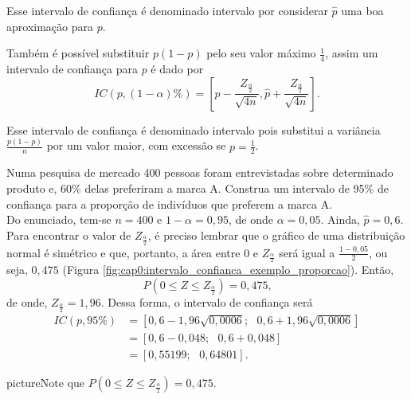 \documentclass[11pt,fleqn]{book}
\numberwithin{mpicture}{chapter}
\numberwithin{mtable}{chapter}
\numberwithin{mframe}{chapter}
\begin{document}
Esse intervalo de confiança é denominado intervalo  por considerar $\hat{p}$ uma boa aproximação para $p$.

Também é possível substituir $p(1-p)$ pelo seu valor máximo $\frac{1}{4}$, assim um intervalo de confiança para $p$ é dado por
\[
	IC(p,  (1-\alpha)\%) = \left [
		\hat{p} - \frac{Z_{\frac{\alpha}{2}}}{\sqrt{4n} }
		,
		\hat{p} + \frac{Z_{\frac{\alpha}{2}}}{\sqrt{4n} }
	\right ]
	\text{.}
\]

Esse intervalo de confiança é denominado intervalo  pois substitui a variância $\frac{p(1-p)}{n}$ por um valor maior, com excessão se $p=\frac{1}{2}$.

\begin{example}
	\label{example:exemplo_proporcao}
	Numa pesquisa de mercado 400 pessoas foram entrevistadas sobre determinado produto e, 60\% delas preferiram a marca A. Construa um intervalo de 95\% de confiança para a proporção de indivíduos que preferem a marca A.\\
	
	Do enunciado, tem-se $n=400$ e $1-\alpha=0,95$, de onde $\alpha=0,05$. Ainda, $\hat{p}=0,6$. Para encontrar o valor de $Z_{\frac{\alpha}{2}}$, é preciso lembrar que o gráfico de uma distribuição normal é simétrico e que, portanto, a área entre 0 e $Z_{\frac{\alpha}{2}}$ será igual a $\frac{1-0,05}{2}$, ou seja, $0,475$ (Figura \ref{fig:cap0:intervalo_confianca_exemplo_proporcao}). Então, 
	\[
		P(0\leqslant Z\leqslant Z_{\frac{\alpha}{2}})=0,475\text{,}
	\]
	de onde, $Z_{\frac{\alpha}{2}}=1,96$. Dessa forma, o intervalo de confiança será
	\begin{align*}
		IC(p, 95\%)&= [0,6-1,96\sqrt{0,0006};\text{ }0,6+1,96\sqrt{0,0006}]\\
				   &= [0,6-0,048;\text{ }0,6+0,048]\\
				   &= [0,55199;\text{ }0,64801]\text{.}
	\end{align*}
\end{example}

\begin{sidepicture}{6cm}{picture}{Note que $P(0\leqslant Z\leqslant Z_{\frac{\alpha}{2}})=0,475$.}
	\label{fig:cap0:intervalo_confianca_exemplo_proporcao}
\end{sidepicture}
\end{document}
